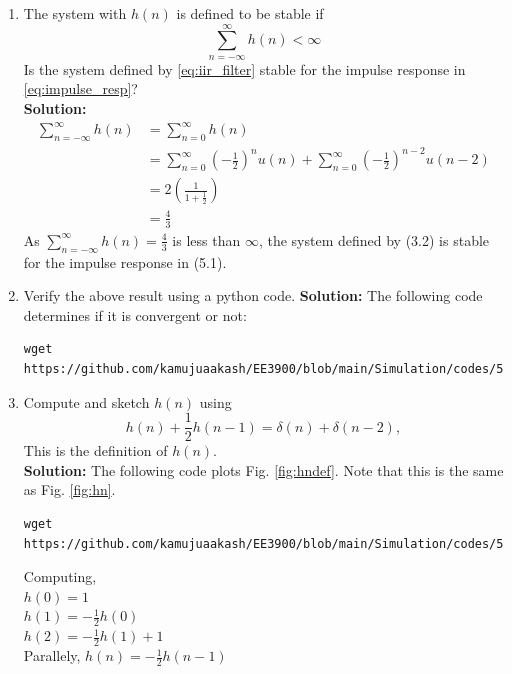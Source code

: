 \documentclass[journal,12pt,twocolumn]{IEEEtran}
\newcommand{\solution}{\noindent \textbf{Solution: }}
\providecommand{\brak}[1]{\ensuremath{\left(#1\right)}}
\numberwithin{equation}{section}
\renewcommand\thesection{\arabic{section}}
\begin{document}
\begin{enumerate}[label=\thesection.\arabic*]
\item The system with $h(n)$ is defined to be stable if
\begin{equation}
\sum_{n=-\infty}^{\infty}h(n) < \infty
\end{equation}
Is the system defined by \eqref{eq:iir_filter} stable for the impulse response in \eqref{eq:impulse_resp}?\\
\solution 
\begin{align}
\sum_{n=-\infty}^{\infty}h(n)&= \sum_{n=0}^{\infty}h(n)\\
&=\sum_{n=0}^{\infty}\brak{-\frac{1}{2}}^{n}u(n) + \sum_{n=0}^{\infty}\brak{-\frac{1}{2}}^{n-2}u(n-2)\\
&=2 \brak{ \frac{1}{1+\frac{1}{2}}}\\
&=\frac{4}{3}
\end{align}
As $\sum_{n=-\infty}^{\infty}h(n)=\frac{4}{3}$ is less than $\infty$, the system defined by (3.2) is stable for the impulse response in (5.1).
%
\item Verify the above result using a python code.
\solution The following code determines if it is convergent or not:
\begin{lstlisting}
wget https://github.com/kamujuaakash/EE3900/blob/main/Simulation/codes/5.5.py
\end{lstlisting}
%
\item 
Compute and sketch $h(n)$ using 
\begin{equation}
\label{eq:iir_filter_h}
h(n) + \frac{1}{2}h(n-1) = \delta(n) + \delta(n-2), 
\end{equation}
%
This is the definition of $h(n)$.
\\
\solution The following code plots Fig. \ref{fig:hndef}. Note that this is the same as Fig. 
\ref{fig:hn}. 
%
\begin{lstlisting}
wget https://github.com/kamujuaakash/EE3900/blob/main/Simulation/codes/5.7.py
\end{lstlisting}
Computing,\\
$h(0)=1$\\
$h(1)=-\frac{1}{2}h(0)$\\
$h(2)=-\frac{1}{2}h(1)+1$\\
Parallely, $h(n)=-\frac{1}{2}h(n-1)$


\end{enumerate}
\end{document}
